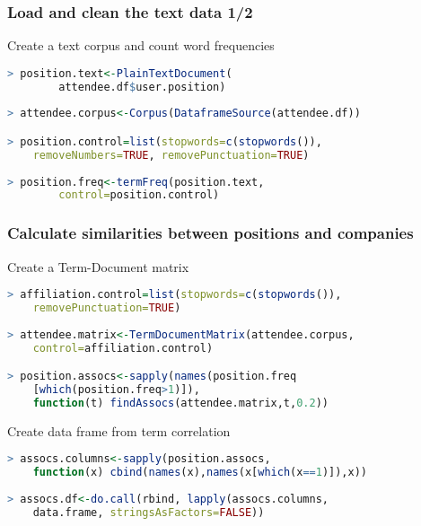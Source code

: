 \documentclass[xcolor=dvipsnames, 9pt]{beamer}
\begin{document}
\begin{frame}[fragile]
    \frametitle{Load and clean the text data 1/2}
    \begin{block}{Create a text corpus and count word frequencies}
        \begin{lstlisting}[language=R]
> position.text<-PlainTextDocument(
        attendee.df$user.position)
        
> attendee.corpus<-Corpus(DataframeSource(attendee.df))

> position.control=list(stopwords=c(stopwords()), 
    removeNumbers=TRUE, removePunctuation=TRUE)
    
> position.freq<-termFreq(position.text, 
        control=position.control)
        \end{lstlisting}
    \end{block}
\end{frame}

\begin{frame}[fragile]
    \frametitle{Calculate similarities between positions and companies}
    \begin{block}{Create a Term-Document matrix}
        \begin{lstlisting}[language=R]
> affiliation.control=list(stopwords=c(stopwords()), 
    removePunctuation=TRUE)
    
> attendee.matrix<-TermDocumentMatrix(attendee.corpus, 
    control=affiliation.control)

> position.assocs<-sapply(names(position.freq
    [which(position.freq>1)]), 
    function(t) findAssocs(attendee.matrix,t,0.2))
        \end{lstlisting}
    \end{block}

    \begin{block}{Create data frame from term correlation}
        \begin{lstlisting}[language=R]
> assocs.columns<-sapply(position.assocs, 
    function(x) cbind(names(x),names(x[which(x==1)]),x))
    
> assocs.df<-do.call(rbind, lapply(assocs.columns, 
    data.frame, stringsAsFactors=FALSE))            
        \end{lstlisting}
    \end{block}
\end{frame}
\end{document}
